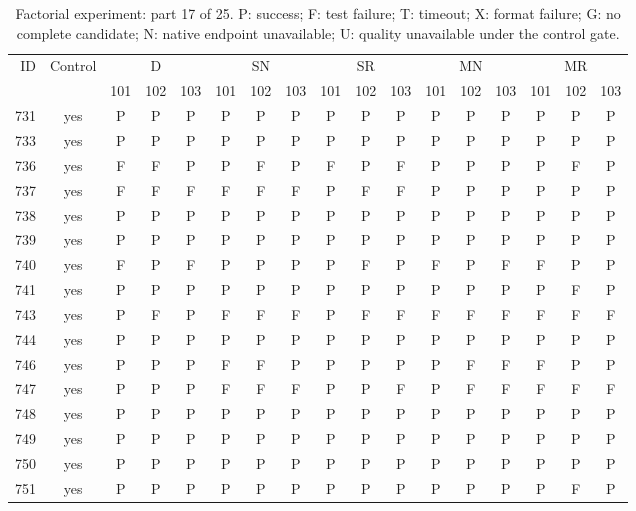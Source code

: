 \begin{table}[p]\centering\footnotesize
\setlength{\tabcolsep}{3pt}
\caption{Factorial experiment: part 17 of 25. P: success; F: test failure; T: timeout; X: format failure; G: no complete candidate; N: native endpoint unavailable; U: quality unavailable under the control gate.}
\begin{tabular*}{\textwidth}{@{\extracolsep{\fill}}rcccccccccccccccc}\toprule
ID & Control & \multicolumn{3}{c}{D} & \multicolumn{3}{c}{SN} & \multicolumn{3}{c}{SR} & \multicolumn{3}{c}{MN} & \multicolumn{3}{c}{MR}\\
\cmidrule(lr){3-5}\cmidrule(lr){6-8}\cmidrule(lr){9-11}\cmidrule(lr){12-14}\cmidrule(lr){15-17}
 & & 101 & 102 & 103 & 101 & 102 & 103 & 101 & 102 & 103 & 101 & 102 & 103 & 101 & 102 & 103\\\midrule
731 & yes & P & P & P & P & P & P & P & P & P & P & P & P & P & P & P\\
733 & yes & P & P & P & P & P & P & P & P & P & P & P & P & P & P & P\\
736 & yes & F & F & P & P & F & P & F & P & F & P & P & P & P & F & P\\
737 & yes & F & F & F & F & F & F & P & F & F & P & P & P & P & P & P\\
738 & yes & P & P & P & P & P & P & P & P & P & P & P & P & P & P & P\\
739 & yes & P & P & P & P & P & P & P & P & P & P & P & P & P & P & P\\
740 & yes & F & P & F & P & P & P & P & F & P & F & P & F & F & P & P\\
741 & yes & P & P & P & P & P & P & P & P & P & P & P & P & P & F & P\\
743 & yes & P & F & P & F & F & F & P & F & F & F & F & F & F & F & F\\
744 & yes & P & P & P & P & P & P & P & P & P & P & P & P & P & P & P\\
746 & yes & P & P & P & F & F & P & P & P & P & P & F & F & F & P & P\\
747 & yes & P & P & P & F & F & F & P & P & F & P & F & F & F & F & F\\
748 & yes & P & P & P & P & P & P & P & P & P & P & P & P & P & P & P\\
749 & yes & P & P & P & P & P & P & P & P & P & P & P & P & P & P & P\\
750 & yes & P & P & P & P & P & P & P & P & P & P & P & P & P & P & P\\
751 & yes & P & P & P & P & P & P & P & P & P & P & P & P & P & F & P\\

\end{tabular*}
\end{table}
